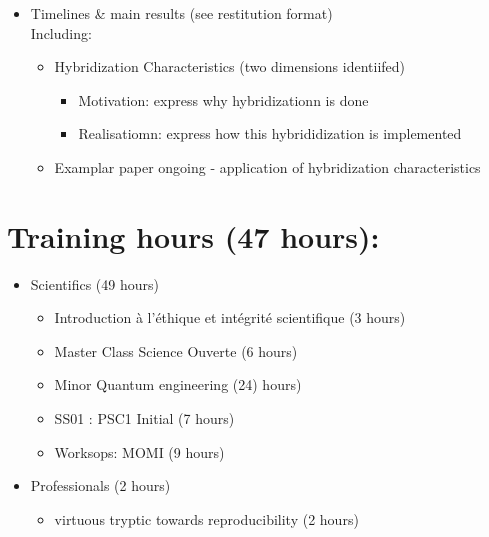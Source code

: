\documentclass[
]{article}
\providecommand{\tightlist}{%
  \setlength{\itemsep}{0pt}\setlength{\parskip}{0pt}}
\begin{document}
\begin{itemize}
\begin{itemize}
    \begin{itemize}
    \tightlist
    \item
      inductive and deductive models level of combinaion. First expose
      some main part of each model and show that each model can be
      combine with the other at different level exposed and the result
      is different
    \end{itemize}
  \end{itemize}
\item
  Timelines \& main results (see restitution format)\\
  Including:

  \begin{itemize}
  \tightlist
  \item
    Hybridization Characteristics (two dimensions identiifed)

    \begin{itemize}
    \tightlist
    \item
      Motivation: express why hybridizationn is done
    \item
      Realisatiomn: express how this hybrididization is implemented
    \end{itemize}
  \item
    Examplar paper ongoing - application of hybridization
    characteristics
  \end{itemize}
\end{itemize}

\section{Training hours (47 hours):}\label{training-hours-47-hours}

\begin{itemize}
\item
  Scientifics (49 hours)

  \begin{itemize}
  \tightlist
  \item
    Introduction à l'éthique et intégrité scientifique (3 hours)
  \item
    Master Class Science Ouverte (6 hours)
  \item
    Minor Quantum engineering (24) hours)
  \item
    SS01 : PSC1 Initial (7 hours)
  \item
    Worksops: MOMI (9 hours)
  \end{itemize}
\item
  Professionals (2 hours)

  \begin{itemize}
  \tightlist
  \item
    virtuous tryptic towards reproducibility (2 hours)
  \end{itemize}
\end{itemize}
\end{document}
